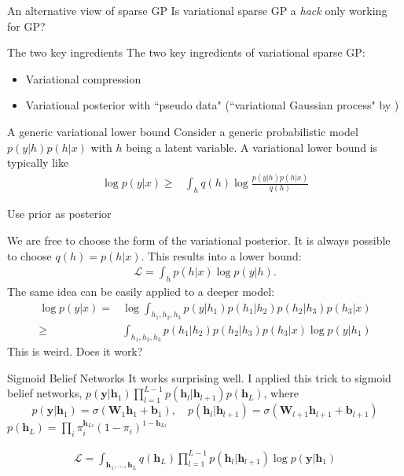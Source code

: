 \documentclass[14pt,aspectratio=1610]{beamer}
\newcommand{\yV}{\mathbf{y}}
\newcommand{\bound}{\mathcal{L}}
\newcommand{\hV}{\mathbf{h}}
\newcommand{\bV}{\mathbf{b}}
\newcommand{\wM}{\mathbf{W}}
\begin{document}
\begin{frame}{An alternative view of sparse GP}
Is variational sparse GP a \textit{hack} only working for GP?
\end{frame}

\begin{frame}{The two key ingredients}
The two key ingredients of variational sparse GP:
\begin{itemize}
\item Variational compression \citep{HensmanLawrence2014}
\item Variational posterior with ``pseudo data" (``variational Gaussian process" by \cite{TranEtAl2016})
\end{itemize}
\end{frame}

\begin{frame}{A generic variational lower bound}
Consider a generic probabilistic model $p(y| h) p(h |x)$ with $h$ being a latent variable. A variational lower bound is typically like
\begin{align*}
\log p(y | x) \geq& \int_{h} q(h) \log \frac{p(y| h) p(h |x)}{q(h)}
\end{align*}
\end{frame}

\begin{frame}{Use prior as posterior}

We are free to choose the form of the variational posterior. It is always possible to choose $q(h) = p(h|x)$.
This results into a lower bound:
\begin{align*}
\bound = \int_h p(h|x) \log p(y|h).
\end{align*}
The same idea can be easily applied to a deeper model:
\begin{align*}
\log p(y | x) =& \log \int_{h_1, h_2, h_3} p(y| h_1) p(h_1|h_2) p(h_2 | h_3) p(h_3 |x ) \\
\geq& \int_{h_1, h_2, h_3} p(h_1|h_2) p(h_2 | h_3) p(h_3 |x ) \log p(y|h_1)
\end{align*}
This is weird. Does it work?
\end{frame}

\begin{frame}{Sigmoid Belief Networks}
It works surprising well. I applied this trick to sigmoid belief networks, $p(\yV|\hV_{1}) \prod_{l=1}^{L-1} p(\hV_{l}|\hV_{l+1}) p(\hV_L)$, where
\[
p(\yV|\hV_{1}) = \sigma(\wM_1\hV_{1}+\bV_1), \quad p(\hV_l|\hV_{l+1}) = \sigma(\wM_{l+1}\hV_{l+1}+\bV_{l+1}) 
\]
$p(\hV_L) = \prod_{i} \pi_i^{\hV_{Li}}(1-\pi_i)^{1-\hV_{Li}}$

\begin{align*}
\bound = \int_{\hV_1, \ldots, \hV_L} q(\hV_L) \prod_{l=1}^{L-1} p(\hV_l|\hV_{l+1}) \log p(\yV|\hV_1)
\end{align*}
\end{frame}
\end{document}
